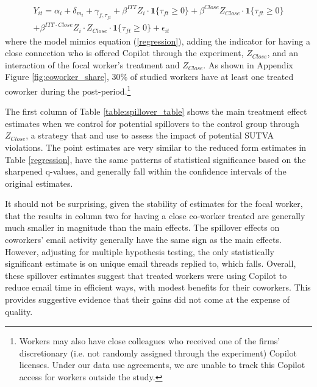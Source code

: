 \documentclass{article}
\begin{document}
\begin{equation}
\begin{split}
    Y_{it} = \alpha_i + \delta_{m_t} + \gamma_{f,\tau_{ft}} + \beta^{ITT} Z_{i}\cdot\mathbf{1}\{\tau_{ft}\geq0\}+\beta^{Close}Z_{Close}\cdot\mathbf{1}\{\tau_{ft}\geq0\} \\
    +\beta^{ITT\cdot Close}Z_i\cdot Z_{Close}\cdot\mathbf{1}\{\tau_{ft}\geq0\}+ \epsilon_{it} 
    \end{split}
    \label{saturated}
\end{equation}
\noindent 
where the model mimics equation (\ref{regression}), adding the indicator for having a close connection who is offered Copilot through the experiment, $Z_{Close}$, and an interaction of the focal worker's treatment and $Z_{Close}$. As shown in Appendix Figure \ref{fig:coworker_share}, 30\% of studied workers have at least one treated coworker during the post-period.\footnote{Workers may also have close colleagues who received one of the firms' discretionary (i.e. not randomly assigned through the experiment) Copilot licenses. Under our data use agreements, we are unable to track this Copilot access for workers outside the study.}  




The first column of Table \ref{table:spillover_table} shows the main treatment effect estimates when we control for potential spillovers to the control group through $Z_{Close}$, a strategy that \cite{de2012effects} and \cite{espinosa2022training} use to assess the impact of potential SUTVA violations.  The point estimates are very similar to the reduced form estimates in Table \ref{regression}, have the same patterns of statistical significance based on the sharpened q-values, and generally fall within the confidence intervals of the original estimates.

It should not be surprising, given the stability of estimates for the focal worker, that the results in column two for having a close co-worker treated are generally much smaller in magnitude than the main effects. The spillover effects on coworkers' email activity generally have the same sign as the main effects. However, adjusting for multiple hypothesis testing, the only statistically significant estimate is on unique email threads replied to, which falls.  Overall, these spillover estimates suggest that treated workers were using Copilot to reduce email time in efficient ways, with modest benefits for their coworkers.  This provides suggestive evidence that their gains did not come at the expense of quality.
\end{document}
